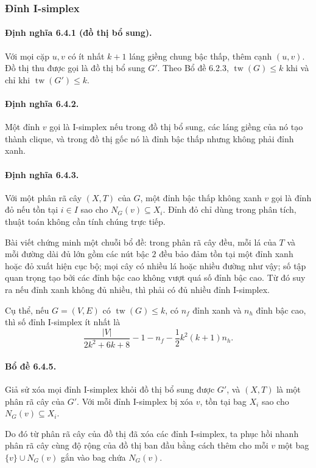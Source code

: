 \documentclass[11pt]{article}
\begin{document}
\subsubsection{Đỉnh I-simplex}

\paragraph{Định nghĩa 6.4.1 (đồ thị bổ sung).}
Với mọi cặp $u,v$ có ít nhất $k+1$ láng giềng chung bậc thấp, thêm cạnh
$(u,v)$. Đồ thị thu được gọi là đồ thị bổ sung $G'$. Theo Bổ đề 6.2.3,
$\operatorname{tw}(G)\le k$ khi và chỉ khi $\operatorname{tw}(G')\le k$.

\paragraph{Định nghĩa 6.4.2.}
Một đỉnh $v$ gọi là I-simplex nếu trong đồ thị bổ sung, các láng giềng của nó
tạo thành clique, và trong đồ thị gốc nó là đỉnh bậc thấp nhưng không phải đỉnh
xanh.

\paragraph{Định nghĩa 6.4.3.}
Với một phân rã cây $(X,T)$ của $G$, một đỉnh bậc thấp không xanh $v$ gọi là
đỉnh đỏ nếu tồn tại $i\in I$ sao cho $N_G(v)\subseteq X_i$. Đỉnh đỏ chỉ dùng
trong phân tích, thuật toán không cần tính chúng trực tiếp.

Bài viết chứng minh một chuỗi bổ đề: trong phân rã cây đều, mỗi lá của $T$ và
mỗi đường dài đủ lớn gồm các nút bậc $2$ đều bảo đảm tồn tại một đỉnh xanh hoặc
đỏ xuất hiện cục bộ; mọi cây có nhiều lá hoặc nhiều đường như vậy; số tập quan
trọng tạo bởi các đỉnh bậc cao không vượt quá số đỉnh bậc cao. Từ đó suy ra
nếu đỉnh xanh không đủ nhiều, thì phải có đủ nhiều đỉnh I-simplex.

Cụ thể, nếu $G=(V,E)$ có $\operatorname{tw}(G)\le k$, có $n_f$ đỉnh xanh và
$n_h$ đỉnh bậc cao, thì số đỉnh I-simplex ít nhất là
\[
  \frac{|V|}{2k^2+6k+8}-1-n_f-\frac12 k^2(k+1)n_h.
\]

\paragraph{Bổ đề 6.4.5.}
Giả sử xóa mọi đỉnh I-simplex khỏi đồ thị bổ sung được $G'$, và $(X,T)$ là một
phân rã cây của $G'$. Với mỗi đỉnh I-simplex bị xóa $v$, tồn tại bag $X_i$ sao
cho $N_G(v)\subseteq X_i$.

Do đó từ phân rã cây của đồ thị đã xóa các đỉnh I-simplex, ta phục hồi nhanh
phân rã cây cùng độ rộng của đồ thị ban đầu bằng cách thêm cho mỗi $v$ một bag
$\{v\}\cup N_G(v)$ gắn vào bag chứa $N_G(v)$.
\end{document}

